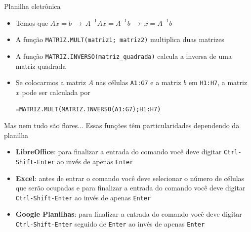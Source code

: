\begin{frame}[c]{Planilha eletrônica}

    \begin{itemize}
        \item Temos que \(Ax=b ~\rightarrow~ A^{-1}Ax=A^{-1}b ~\rightarrow~ x=A^{-1}b\)
        \item A função \texttt{MATRIZ.MULT(matriz1; matriz2)} multiplica duas matrizes
        \item A função \texttt{MATRIZ.INVERSO(matriz\_quadrada)} calcula a inversa de uma matriz quadrada
        \item Se colocarmos a matriz \(A\) nas células \texttt{A1:G7} e a matriz \(b\) em \texttt{H1:H7}, a matriz \(x\) pode ser calculada por
            \begin{center}
                \texttt{=MATRIZ.MULT(MATRIZ.INVERSO(A1:G7);H1:H7)}
            \end{center}
    \end{itemize}

\end{frame}

\begin{frame}[c]{Mas nem tudo são flores...}
    Essas funções têm particularidades dependendo da planilha
    \begin{itemize}
        \item \textbf{LibreOffice}: para finalizar a entrada do comando você deve digitar \texttt{Ctrl-Shift-Enter} ao invés de apenas \texttt{Enter}
        \item \textbf{Excel}: antes de entrar o comando você deve selecionar o número de células que serão ocupadas e para finalizar a entrada do comando você deve digitar \texttt{Ctrl-Shift-Enter} ao invés de apenas \texttt{Enter}
        \item \textbf{Google Planilhas}: para finalizar a entrada do comando você deve digitar \texttt{Ctrl-Shift-Enter} seguido de \texttt{Enter} ao invés de apenas \texttt{Enter}
    \end{itemize}

\end{frame}

